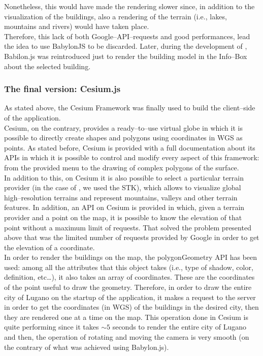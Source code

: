 Nonetheless, this would have made the rendering slower since, in addition to the visualization of the buildings, also a rendering of the terrain (i.e., lakes, mountains and rivers) would have taken place.\\
Therefore, this lack of both Google--API--requests and good performances, lead the idea to use BabylonJS to be discarded. Later, during the development of \applicationName, Babilon.js was reintroduced just to render the building model in the Info--Box about the selected building. 
\subsubsection{The final version: Cesium.js}
As stated above, the Cesium Framework was finally used to build the client--side of the application.\\
Cesium, on the contrary, provides a ready--to--use virtual globe in which it is possible to directly create shapes and polygons using coordinates in WGS as points. As stated before, Cesium is provided with a full documentation about its APIs in which it is possible to control and modify every aspect of this framework: from the provided menu to the drawing of complex polygons of the surface.\\

In addition to this, on Cesium it is also possible to select a particular terrain provider (in the case of \applicationName, we used the STK), which allows to visualize global high--resolution terrains and represent mountains, valleys and other terrain features. In addition, an API on Cesium is provided in which, given a terrain provider and a point on the map, it is possible to know the elevation of that point without a maximum limit of requests. That solved the problem presented above that was the limited number of requests provided by Google in order to get the elevation of a coordinate.\\

In order to render the buildings on the map, the polygonGeometry API has been used: among all the attributes that this object takes (i.e., type of shadow, color, definition, etc\dots), it also takes an array of coordinates. These are the coordinates of the point useful to draw the geometry. Therefore, in order to draw the entire city of Lugano on the startup of the application, it makes a request to the server in order to get the coordinates (in WGS) of the buildings in the desired city, then they are rendered one at a time on the map. This operation done in Cesium is quite performing since it takes $\sim 5$ seconds to render the entire city of Lugano and then, the operation of rotating and moving the camera is very smooth (on the contrary of what was achieved using Babylon.js).\\

